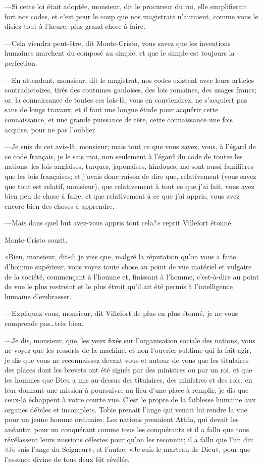 —Si cette loi était adoptée, monsieur, dit le procureur du roi, elle simplifierait fort nos codes, et c'est pour le coup que nos magistrats n'auraient, comme vous le disiez tout à l'heure, plus grand-chose à faire. 

—Cela viendra peut-être, dit Monte-Cristo, vous savez que les inventions humaines marchent du composé au simple, et que le simple est toujours la perfection. 

—En attendant, monsieur, dit le magistrat, nos codes existent avec leurs articles contradictoires, tirés des coutumes gauloises, des lois romaines, des usages francs; or, la connaissance de toutes ces lois-là, vous en conviendrez, ne s'acquiert pas sans de longs travaux, et il faut une longue étude pour acquérir cette connaissance, et une grande puissance de tête, cette connaissance une fois acquise, pour ne pas l'oublier. 

—Je suis de cet avis-là, monsieur; mais tout ce que vous savez, vous, à l'égard de ce code français, je le sais moi, non seulement à l'égard du code de toutes les nations: les lois anglaises, turques, japonaises, hindoues, me sont aussi familières que les lois françaises; et j'avais donc raison de dire que, relativement (vous savez que tout est relatif, monsieur), que relativement à tout ce que j'ai fait, vous avez bien peu de chose à faire, et que relativement à ce que j'ai appris, vous avez encore bien des choses à apprendre. 

—Mais dans quel but avez-vous appris tout cela?» reprit Villefort étonné. 

Monte-Cristo sourit. 

«Bien, monsieur, dit-il; je vois que, malgré la réputation qu'on vous a faite d'homme supérieur, vous voyez toute chose au point de vue matériel et vulgaire de la société, commençant à l'homme et, finissant à l'homme, c'est-à-dire au point de vue le plus restreint et le plus étroit qu'il ait été permis à l'intelligence humaine d'embrasser. 

—Expliquez-vous, monsieur, dit Villefort de plus en plus étonné, je ne vous comprends pas\dots très bien. 

—Je dis, monsieur, que, les yeux fixés sur l'organisation sociale des nations, vous ne voyez que les ressorts de la machine, et non l'ouvrier sublime qui la fait agir, je dis que vous ne reconnaissez devant vous et autour de vous que les titulaires des places dont les brevets ont été signés par des ministres ou par un roi, et que les hommes que Dieu a mis au-dessus des titulaires, des ministres et des rois, en leur donnant une mission à poursuivre au lieu d'une place à remplir, je dis que ceux-là échappent à votre courte vue. C'est le propre de la faiblesse humaine aux organes débiles et incomplets. Tobie prenait l'ange qui venait lui rendre la vue pour un jeune homme ordinaire. Les nations prenaient Attila, qui devait les anéantir, pour un conquérant comme tous les conquérants et il a fallu que tous révélassent leurs missions célestes pour qu'on les reconnût; il a fallu que l'un dit: «Je suis l'ange du Seigneur»; et l'autre: «Je suis le marteau de Dieu», pour que l'essence divine de tous deux fût révélée. 

